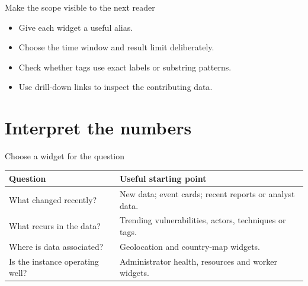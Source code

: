 \begin{frame}{Make the scope visible to the next reader}
    \begin{itemize}
        \item Give each widget a useful alias.
        \item Choose the time window and result limit deliberately.
        \item Check whether tags use exact labels or substring patterns.
        \item Use drill-down links to inspect the contributing data.
    \end{itemize}
\end{frame}

\section{Interpret the numbers}

\begin{frame}{Choose a widget for the question}
    \small
    \begin{tabular}{@{}P{3.1cm}P{7.1cm}@{}}
        \toprule
        Question & Useful starting point \\
        \midrule
        What changed recently? & New data; event cards; recent reports or analyst data. \\
        What recurs in the data? & Trending vulnerabilities, actors, techniques or tags. \\
        Where is data associated? & Geolocation and country-map widgets. \\
        Is the instance operating well? & Administrator health, resources and worker widgets. \\
        \bottomrule
    \end{tabular}
\end{frame}

